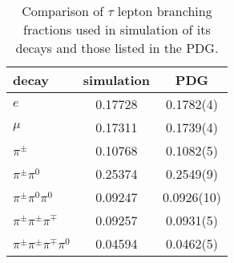 \begin{table}[ht]
    \centering
    \setlength{\tabcolsep}{4em}
    \renewcommand{\arraystretch}{1.1}
    \caption{Comparison of $\tau$ lepton branching fractions used in simulation of its decays and those listed in the PDG.} 
    
    \begin{tabular}{l|cc}
        \hline
        decay                                & simulation & PDG       \\
        \hline
        $e$                                  & 0.17728    & 0.1782(4) \\
        $\mu$                                & 0.17311    & 0.1739(4) \\
        $\pi^{\pm}$                          & 0.10768    & 0.1082(5) \\
        $\pi^{\pm}\pi^{0}$                   & 0.25374    & 0.2549(9) \\
        $\pi^{\pm}\pi^{0}\pi^{0}$            & 0.09247    & 0.0926(10) \\
        $\pi^{\pm}\pi^{\pm}\pi^{\mp}$        & 0.09257    & 0.0931(5) \\
        $\pi^{\pm}\pi^{\pm}\pi^{\mp}\pi^{0}$ & 0.04594    & 0.0462(5) \\
        \hline
    \end{tabular}
    
    \label{tab:dat:tauDecayBr}
\end{table}